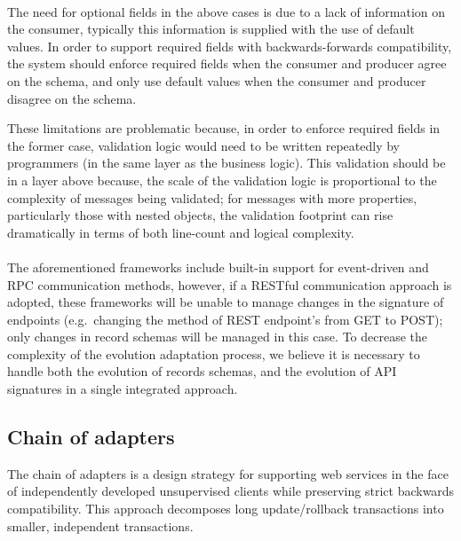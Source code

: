 \paragraph{}

The need for optional fields in the above cases is due to a lack of information on the consumer, typically this information is supplied with the use of default values.
In order to support required fields with backwards-forwards compatibility, the system should enforce required fields when the consumer and producer agree on the schema,
and only use default values when the consumer and producer disagree on the schema.

These limitations are problematic because, in order to enforce required fields in the former case,
validation logic would need to be written repeatedly by programmers (in the same layer as the business logic).
This validation should be in a layer above because, the scale of the validation logic is proportional to the complexity of messages being validated;
for messages with more properties, particularly those with nested objects, the validation footprint can rise dramatically in terms of both line-count and logical complexity.

\paragraph{}

The aforementioned frameworks include built-in support for event-driven and RPC communication methods,
however, if a RESTful communication approach is adopted, these frameworks will be unable to manage changes in the signature of endpoints
(e.g.\ changing the method of REST endpoint's from GET to POST); only changes in record schemas will be managed in this case.
To decrease the complexity of the evolution adaptation process, we believe it is necessary to handle both the evolution of records schemas, and the evolution of API signatures in a single integrated approach.

\subsection{Chain of adapters} %
\label{sec:chain_of_adapters}

The chain of adapters is a design strategy for supporting web services in the face of independently developed unsupervised clients while preserving strict backwards compatibility.
This approach decomposes long update/rollback transactions into smaller, independent transactions.

